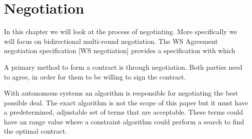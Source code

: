 \chapter{Negotiation}
In this chapter we will look at the process of negotiating. More specifically we will focus on bidirectional multi-round negotiation. The WS Agreement negotiation specification [WS negotiation] provides a specification with which

A primary method to form a contract is through negotiation. Both parties need to agree, in order for them to be willing to sign the contract. 

With autonomous systems an algorithm is responsible for negotiating the best possible deal. The exact algorithm is not the scope of this paper but it must have a predetermined, adjustable set of terms that are acceptable. These terms could have an range value where a constraint algorithm could perform a search to find the optimal contract.